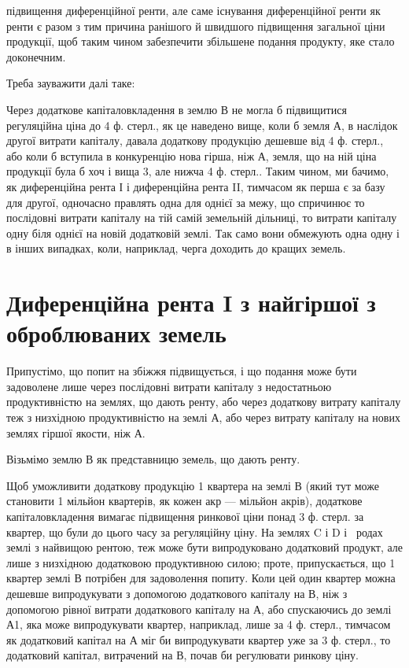 \parcont{}  %
підвищення диференційної ренти, але саме існування диференційної ренти як
ренти є разом з тим причина ранішого й швидшого підвищення загальної ціни
продукції, щоб таким чином забезпечити збільшене подання продукту, яке стало доконечним.

Треба зауважити далі таке:

Через додаткове капіталовкладення в землю В не могла б підвищитися
регуляційна ціна до 4 ф. стерл., як це наведено вище, коли б земля А, в наслідок
другої витрати капіталу, давала додаткову продукцію дешевше від 4 ф.
стерл., або коли б вступила в конкуренцію нова гірша, ніж А, земля, що на
ній ціна продукції була б хоч і вища 3, але нижча 4 ф. стерл.. Таким чином,
ми бачимо, як диференційна рента І і диференційна рента II, тимчасом як
перша є за базу для другої, одночасно правлять одна для однієї за межу, що
спричинює то послідовні витрати капіталу на тій самій земельній дільниці, то
витрати капіталу одну біля однієї на новій додатковій землі. Так само вони
обмежують одна одну і в інших випадках, коли, наприклад, черга доходить до
кращих земель.

\section{Диференційна рента I з найгіршої з оброблюваних земель}

Припустімо, що попит на збіжжя підвищується, і що подання може бути
задоволене лише через послідовні витрати капіталу з недостатньою продуктивністю
на землях, що дають ренту, або через додаткову витрату капіталу
теж з низхідною продуктивністю на землі А, або через витрату капіталу на
нових землях гіршої якости, ніж А.

Візьмімо землю В як представницю земель, що дають ренту.

Щоб уможливити додаткову продукцію 1 квартера на землі В (який
тут може становити 1 мільйон квартерів, як кожен акр — мільйон акрів), додаткове
капіталовкладення вимагає підвищення ринкової ціни понад 3 ф. стерл.
за квартер, що були до цього часу за регуляційну ціну. На землях C і D і~ родах землі з найвищою рентою, теж може бути випродуковано додатковий
продукт, але лише з низхідною додатковою продуктивною силою; проте,
припускається, що 1 квартер землі В потрібен для задоволення попиту.
Коли цей один квартер можна дешевше випродукувати з допомогою додаткового
капіталу на В, ніж з допомогою рівної витрати додаткового капіталу
на А, або спускаючись до землі А1, яка може випродукувати квартер, наприклад,
лише за 4 ф. стерл., тимчасом як додатковий капітал на А міг би випродукувати
квартер уже за 3 ф. стерл., то додатковий капітал, витрачений на
В, почав би регулювати ринкову ціну.

